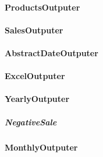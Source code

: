 		\paragraph{ProductsOutputer}
		\paragraph{SalesOutputer}
		\paragraph{AbstractDateOutputer}
		\paragraph{ExcelOutputer}
		\paragraph{YearlyOutputer}
			\subparagraph{NegativeSale}
		\paragraph{MonthlyOutputer}

